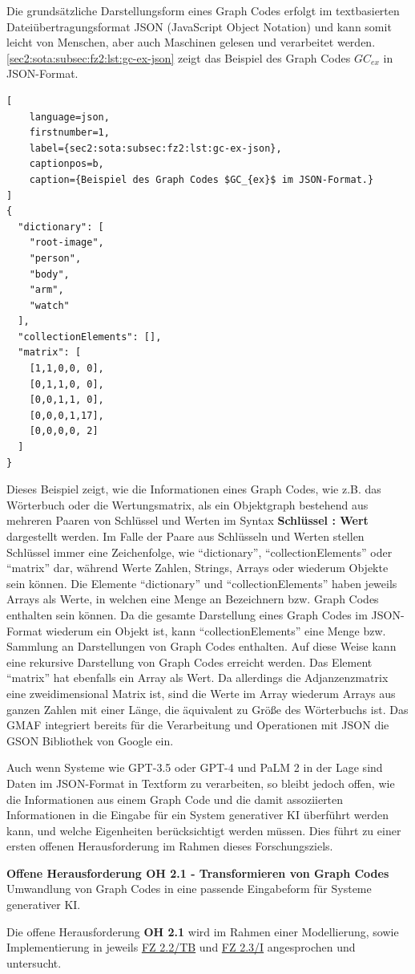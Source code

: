 Die grundsätzliche Darstellungsform eines Graph Codes erfolgt im textbasierten Dateiübertragungsformat JSON (JavaScript Object Notation) und kann somit leicht von Menschen, aber auch Maschinen gelesen und verarbeitet werden.
\cref{sec2:sota:subsec:fz2:lst:gc-ex-json} zeigt das Beispiel des Graph Codes $GC_{ex}$ in JSON-Format.
\begin{lstlisting}[
    language=json,
    firstnumber=1,
    label={sec2:sota:subsec:fz2:lst:gc-ex-json},
    captionpos=b,
    caption={Beispiel des Graph Codes $GC_{ex}$ im JSON-Format.}
]
{
  "dictionary": [
    "root-image",
    "person",
    "body",
    "arm",
    "watch"
  ],
  "collectionElements": [],
  "matrix": [
    [1,1,0,0, 0],
    [0,1,1,0, 0],
    [0,0,1,1, 0],
    [0,0,0,1,17],
    [0,0,0,0, 2]
  ]
}
\end{lstlisting}

Dieses Beispiel zeigt, wie die Informationen eines Graph Codes, wie z.B. das Wörterbuch oder die Wertungsmatrix, als ein Objektgraph bestehend aus mehreren Paaren von Schlüssel und Werten im Syntax \textbf{Schlüssel : Wert} dargestellt werden.
Im Falle der Paare aus Schlüsseln und Werten stellen Schlüssel immer eine Zeichenfolge, wie \enquote{dictionary}, \enquote{collectionElements} oder \enquote{matrix} dar, während Werte Zahlen, Strings, Arrays oder wiederum Objekte sein können.
Die Elemente \enquote{dictionary} und \enquote{collectionElements} haben jeweils Arrays als Werte, in welchen eine Menge an Bezeichnern bzw. Graph Codes enthalten sein können.
Da die gesamte Darstellung eines Graph Codes im JSON-Format wiederum ein Objekt ist, kann \enquote{collectionElements} eine Menge bzw. Sammlung an Darstellungen von Graph Codes enthalten.
Auf diese Weise kann eine rekursive Darstellung von Graph Codes erreicht werden.
Das Element \enquote{matrix} hat ebenfalls ein Array als Wert.
Da allerdings die Adjanzenzmatrix eine zweidimensional Matrix ist, sind die Werte im Array wiederum Arrays aus ganzen Zahlen mit einer Länge, die äquivalent zu Größe des Wörterbuchs ist.
Das GMAF integriert bereits für die Verarbeitung und Operationen mit JSON die GSON \cite{gson} Bibliothek von Google ein.

Auch wenn Systeme wie GPT-3.5 oder GPT-4 und PaLM 2 in der Lage sind Daten im JSON-Format in Textform zu verarbeiten, so bleibt jedoch offen, wie die Informationen aus einem Graph Code und die damit assoziierten Informationen in die Eingabe für ein System generativer KI überführt werden kann, und welche Eigenheiten berücksichtigt werden müssen.
Dies führt zu einer ersten offenen Herausforderung im Rahmen dieses Forschungsziels.
\begin{tcolorbox}[minipage, colback=white, colframe=black, arc=0pt, outer arc=0pt]
    \textbf{Offene Herausforderung OH 2.1 - Transformieren von Graph Codes} \\
    Umwandlung von Graph Codes in eine passende Eingabeform für Systeme generativer KI.
\end{tcolorbox}
Die offene Herausforderung \textbf{OH 2.1} wird im Rahmen einer Modellierung, sowie Implementierung in jeweils \hyperref[sec3:model:subsec:fz-integration]{FZ 2.2/TB} und \hyperref[sec4:impl:subsec:fz-integration]{FZ 2.3/I} angesprochen und untersucht.

